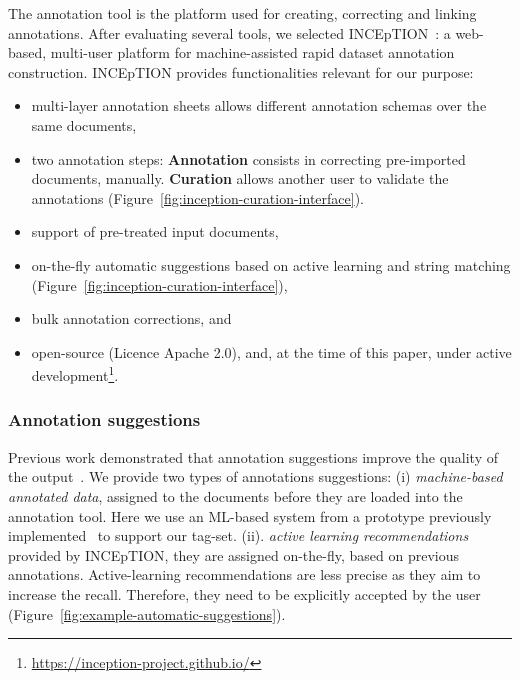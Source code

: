 \documentclass[fleqn,10pt]{wlscirep}
\begin{document}
The annotation tool is the platform used for creating, correcting and linking annotations.
After evaluating several tools, we selected INCEpTION~\cite{tubiblio106270,eckart-de-castilho-etal-2016-web}: a web-based, multi-user platform for machine-assisted rapid dataset annotation construction. 
INCEpTION provides functionalities relevant for our purpose: 
\begin{itemize}
    \item multi-layer annotation sheets allows different annotation schemas over the same documents, 
    \item two annotation steps: \textbf{Annotation} consists in correcting pre-imported documents, manually. \textbf{Curation} allows another user to validate the annotations (Figure~\ref{fig:inception-curation-interface}). 
    \item support of pre-treated input documents,
    \item on-the-fly automatic suggestions based on active learning and string matching (Figure~\ref{fig:inception-curation-interface}), 
    \item bulk annotation corrections, and 
    \item open-source (Licence Apache 2.0), and, at the time of this paper, under active development\footnote{\url{https://inception-project.github.io/}}.
\end{itemize}

\subsubsection*{Annotation suggestions}
\label{subsec:automatic-system-prototype}

Previous work demonstrated that annotation suggestions improve the quality of the output~\cite{Fort2010InfluenceOP,Nvol2011SemiautomaticSA,Lingren2014EvaluatingTI}.
We provide two types of annotations suggestions: (i) \textit{machine-based annotated data}, assigned to the documents before they are loaded into the annotation tool. Here we use an ML-based system from a prototype previously implemented~\cite{foppiano2019proposal} to support our tag-set. (ii). \textit{active learning recommendations} provided by INCEpTION, they are assigned on-the-fly, based on previous annotations. 
Active-learning recommendations are less precise as they aim to increase the recall. Therefore, they need to be explicitly accepted by the user (Figure~\ref{fig:example-automatic-suggestions}). 
\end{document}
